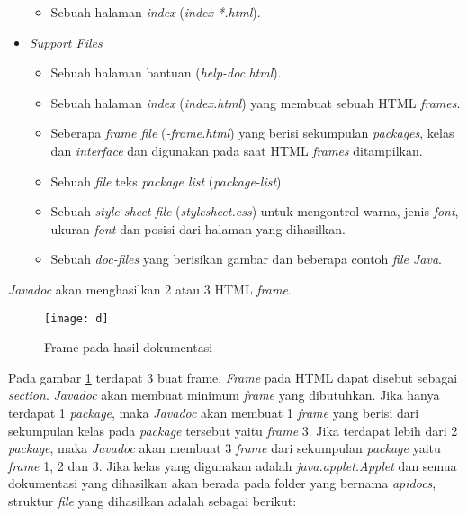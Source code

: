 \begin{itemize}
\begin{itemize}
		\item Sebuah halaman {\it index} ({\it index-*.html}).
	\end{itemize}
	\item {\it Support Files}
	\begin{itemize}
		\item Sebuah halaman bantuan ({\it help-doc.html}).
		\item Sebuah halaman {\it index} ({\it index.html}) yang membuat sebuah HTML {\it frames}.
		\item Seberapa {\it frame file} ({\it *-frame.html}) yang berisi sekumpulan {\it packages}, kelas dan {\it interface} dan digunakan pada saat HTML {\it frames} ditampilkan.
		\item Sebuah {\it file} teks {\it package list} ({\it package-list}).
		\item Sebuah {\it style sheet file} ({\it stylesheet.css}) untuk mengontrol warna, jenis {\it font}, ukuran {\it font} dan posisi dari halaman yang dihasilkan.
		\item Sebuah {\it doc-files} yang berisikan gambar dan beberapa contoh {\it file Java}.
	\end{itemize}
\end{itemize}
{\it Javadoc} akan menghasilkan 2 atau 3 HTML {\it frame}.
	\begin{figure}[H]
	  \centering  
	  \texttt{[image: d]}
	  \caption[Frame pada hasil dokumentasi]{Frame pada hasil dokumentasi}
	  \label{fig:d} 
    \end{figure}
    Pada gambar \ref{fig:d} terdapat 3 buat frame. {\it Frame} pada HTML dapat disebut sebagai {\it section}. {\it Javadoc} akan membuat minimum {\it frame} yang dibutuhkan. Jika hanya terdapat 1 {\it package}, maka {\it Javadoc} akan membuat 1 {\it frame} yang berisi dari sekumpulan kelas pada {\it package} tersebut yaitu {\it frame} 3. Jika terdapat lebih dari 2 {\it package}, maka {\it Javadoc} akan membuat 3 {\it frame} dari sekumpulan {\it package} yaitu {\it frame} 1, 2 dan 3. 
Jika kelas yang digunakan adalah {\it java.applet.Applet} dan semua dokumentasi yang dihasilkan akan berada pada folder yang bernama {\it apidocs}, struktur {\it file} yang dihasilkan adalah sebagai berikut:
